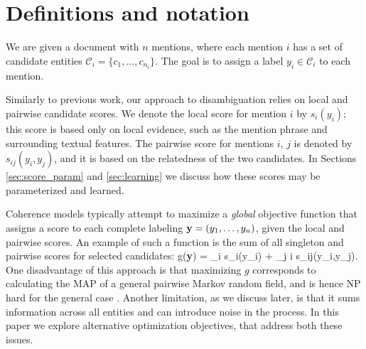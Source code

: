 

\section{Definitions and notation}

We are given a document with $n$ mentions, where each mention $i$ has a set of candidate entities $\mathcal{C}_i = \{c_1, ..., c_{n_i}\}$. The goal is to assign a label $y_i \in \mathcal{C}_i$ to each mention.

Similarly to previous work, our approach to disambiguation relies on local and pairwise candidate scores. We denote the local score for mention $i$ by $s_i(y_i)$; this score is based only on local evidence, such as the mention phrase and surrounding textual features. The pairwise score for mentions $i$, $j$ is denoted by $s_{ij}(y_i, y_j)$,  and it is based on the relatedness of the two candidates. In Sections \ref{sec:score_param} and \ref{sec:learning} we discuss how these scores may be parameterized and learned. 


Coherence models typically attempt to maximize a {\em global} objective function that assigns a score to each complete labeling ${\bf y} = (y_1,\ldots, y_n)$, given the local and pairwise scores. An example of such a function is the sum of all singleton and pairwise scores for selected candidates:
\be
g({\bf y}) = \sum_i s_i(y_i) + \sum_{j \neq i} s_{ij}(y_i,y_j).
\label{eq:global_obj}
\ee 
One disadvantage of this approach is that maximizing $g$ corresponds to calculating the MAP of a general pairwise Markov random field, and is hence
NP hard for the general case \cite{wainwright2008graphical}. Another limitation, as we discuss later, is that it sums information across all entities and can introduce noise in the process. In this paper we explore alternative optimization objectives, that address both these issues.
